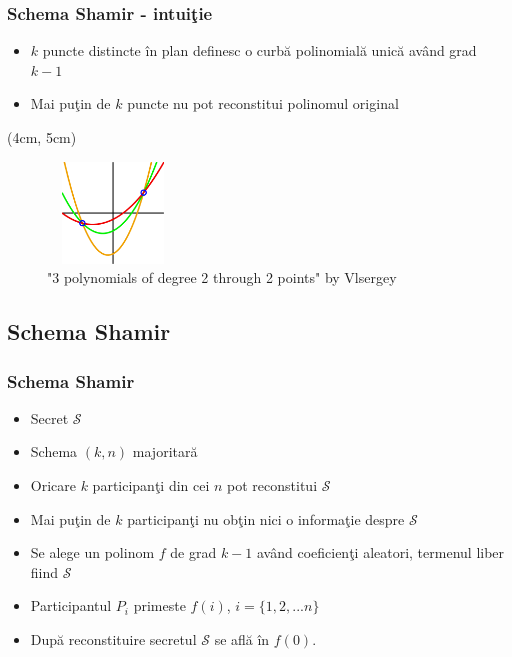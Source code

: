 \documentclass{beamer}
\theoremstyle{definition}
\begin{document}
\begin{frame}
    \frametitle{Schema Shamir - intui\c{t}ie}
    \begin{itemize}
        \item $k$ puncte distincte \^{i}n plan definesc o curb\u{a} polinomial\u{a} unic\u{a} av\^{a}nd grad $k - 1$
        \pause
        \item Mai pu\c{t}in de $k$ puncte nu pot reconstitui polinomul original
    \end{itemize}
    \pause
     {
        \begin{textblock*}{4cm}(4cm, 5cm)
        \begin{figure}
            \includegraphics[width=3.5cm,height=2.7cm,keepaspectratio]{img/shamir/shamir.png}
            \caption{"3 polynomials of degree 2 through 2 points" by Vlsergey}
        \end{figure}
        \end{textblock*}
     }
\end{frame}

\subsection{Schema Shamir}
\begin{frame}
    \frametitle{Schema Shamir}
    \begin{itemize}
        \item Secret $\mathcal{S}$
        \pause
        \item Schema $(k,n)$ majoritar\u{a}
        \pause
        \item Oricare $k$ participan\c{t}i din cei $n$ pot reconstitui $\mathcal{S}$
        \pause
        \item Mai pu\c{t}in de $k$ participan\c{t}i nu ob\c{t}in nici o informa\c{t}ie despre $\mathcal{S}$
        \pause
        \item Se alege un polinom $f$ de grad $k - 1$ av\^{a}nd coeficien\c{t}i aleatori, termenul liber fiind $\mathcal{S}$
        \pause
        \item Participantul $P_i$ primeste $f(i)$, $i = \{1, 2, ...n\}$
        \pause
        \item Dup\u{a} reconstituire secretul $\mathcal{S}$ se afl\u{a} \^{i}n $f(0)$.
    \end{itemize}
\end{frame}
\end{document}
